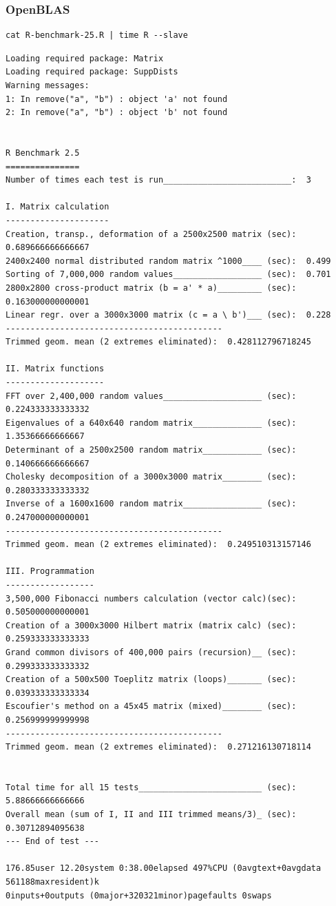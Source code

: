 \documentclass{article}
\begin{document}
\subsubsection*{OpenBLAS}
\label{sec:orgade731f}
\begin{verbatim}
cat R-benchmark-25.R | time R --slave
\end{verbatim}

\begin{verbatim}
Loading required package: Matrix
Loading required package: SuppDists
Warning messages:
1: In remove("a", "b") : object 'a' not found
2: In remove("a", "b") : object 'b' not found


R Benchmark 2.5
===============
Number of times each test is run__________________________:  3

I. Matrix calculation
---------------------
Creation, transp., deformation of a 2500x2500 matrix (sec):  0.689666666666667
2400x2400 normal distributed random matrix ^1000____ (sec):  0.499
Sorting of 7,000,000 random values__________________ (sec):  0.701
2800x2800 cross-product matrix (b = a' * a)_________ (sec):  0.163000000000001
Linear regr. over a 3000x3000 matrix (c = a \ b')___ (sec):  0.228
--------------------------------------------
Trimmed geom. mean (2 extremes eliminated):  0.428112796718245

II. Matrix functions
--------------------
FFT over 2,400,000 random values____________________ (sec):  0.224333333333332
Eigenvalues of a 640x640 random matrix______________ (sec):  1.35366666666667
Determinant of a 2500x2500 random matrix____________ (sec):  0.140666666666667
Cholesky decomposition of a 3000x3000 matrix________ (sec):  0.280333333333332
Inverse of a 1600x1600 random matrix________________ (sec):  0.247000000000001
--------------------------------------------
Trimmed geom. mean (2 extremes eliminated):  0.249510313157146

III. Programmation
------------------
3,500,000 Fibonacci numbers calculation (vector calc)(sec):  0.505000000000001
Creation of a 3000x3000 Hilbert matrix (matrix calc) (sec):  0.259333333333333
Grand common divisors of 400,000 pairs (recursion)__ (sec):  0.299333333333332
Creation of a 500x500 Toeplitz matrix (loops)_______ (sec):  0.039333333333334
Escoufier's method on a 45x45 matrix (mixed)________ (sec):  0.256999999999998
--------------------------------------------
Trimmed geom. mean (2 extremes eliminated):  0.271216130718114


Total time for all 15 tests_________________________ (sec):  5.88666666666666
Overall mean (sum of I, II and III trimmed means/3)_ (sec):  0.30712894095638
--- End of test ---

176.85user 12.20system 0:38.00elapsed 497%CPU (0avgtext+0avgdata 561188maxresident)k
0inputs+0outputs (0major+320321minor)pagefaults 0swaps
\end{verbatim}
\end{document}
